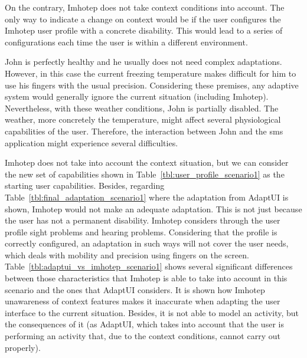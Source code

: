 On the contrary, Imhotep does not take context conditions into account. The only
way to indicate a change on context would be if the user configures the Imhotep 
user profile with a concrete disability. This would lead to a series of 
configurations each time the user is within a different environment.

\label{sec:scenario1_conclusions}

John is perfectly healthy and he usually does not need complex adaptations. 
However, in this case the current freezing temperature makes difficult for him
to use his fingers with the usual precision. Considering these premises, any 
adaptive system would generally ignore the current situation (including Imhotep).
Nevertheless, with these weather conditions, John is partially disabled. The
weather, more concretely the temperature, might affect several physiological
capabilities of the user. Therefore, the interaction between John and the \ac{sms}
application might experience several difficulties.

Imhotep does not take into account the context situation, but we can consider 
the new set of capabilities shown in Table~\ref{tbl:user_profile_scenario1} as 
the starting user capabilities. Besides, regarding
Table~\ref{tbl:final_adaptation_scenario1} where the adaptation from AdaptUI is 
shown, Imhotep would not make an adequate adaptation. This is not just because 
the user has not a permanent disability. Imhotep considers through the user 
profile sight problems and hearing problems. Considering that the profile is 
correctly configured, an adaptation in such ways will not cover the user needs, 
which deals with mobility and precision using fingers on  the screen. 
Table~\ref{tbl:adaptui_vs_imhotep_scenario1} shows several significant 
differences between those characteristics that Imhotep is able to take into 
account in this scenario and the ones that AdaptUI considers. It is shown how 
Imhotep unawareness of context features makes it inaccurate when adapting the 
user interface to the current situation. Besides, it is not able to model an 
activity, but the consequences of it (as AdaptUI, which takes into account that 
the user is performing an activity that, due to the context conditions, cannot 
carry out properly).

